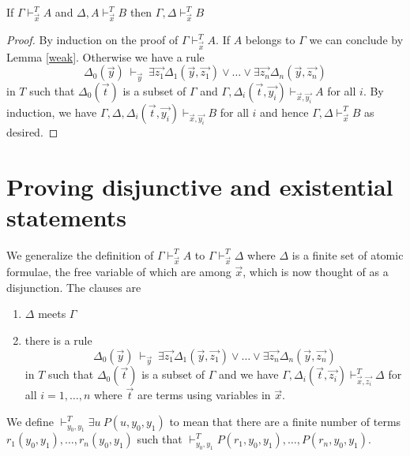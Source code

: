 \documentclass[10pt,a4paper]{article}
\begin{document}
\begin{lemma}\label{cut}
If $\Gamma\vdash_{\vec{x}}^T A$ and $\Delta,A\vdash_{\vec{x}}^T B$ then
$\Gamma,\Delta\vdash_{\vec{x}}^T B$
\end{lemma}

\begin{proof}
By induction on the proof of $\Gamma\vdash_{\vec{x}}^T A$. If $A$ belongs to $\Gamma$ we can
conclude by Lemma \ref{weak}. 
Otherwise we have a rule
$$
\Delta_0(\vec{y})~\vdash_{\vec{y}}~
\exists \vec{z_1}\Delta_1(\vec{y},\vec{z_1})\vee\dots\vee\exists \vec{z_n}\Delta_n(\vec{y},\vec{z_n})
$$
in $T$ such that $\Delta_0(\vec{t})$ is a subset of $\Gamma$ and
$\Gamma,\Delta_i(\vec{t},\vec{y_i})\vdash_{\vec{x},\vec{y_i}} A$ for all $i$.
By induction, we have $\Gamma,\Delta,\Delta_i(\vec{t},\vec{y_i})\vdash_{\vec{x},\vec{y_i}} B$ for all $i$
and hence $\Gamma,\Delta\vdash_{\vec{x}}^T B$ as desired.
\end{proof}

\section{Proving disjunctive and existential statements}

 We generalize the definition of $\Gamma\vdash_{\vec{x}}^T A$ to 
$\Gamma\vdash_{\vec{x}}^T \Delta$ where $\Delta$ is a finite set of atomic formulae, the free
variable of which are among $\vec{x}$, which is now thought of as a disjunction. The clauses are

\begin{enumerate}
\item $\Delta$ meets $\Gamma$

\item there is a rule
$$
\Delta_0(\vec{y})~\vdash_{\vec{y}}~
\exists \vec{z_1}\Delta_1(\vec{y},\vec{z_1})\vee\dots\vee\exists \vec{z_n}\Delta_n(\vec{y},\vec{z_n})
$$
in $T$ such that $\Delta_0(\vec{t})$ is a subset of $\Gamma$ and
we have $\Gamma,\Delta_i(\vec{t},\vec{z_i})\vdash^T_{\vec{x},\vec{z_i}} \Delta$ for all $i = 1,\dots,n$
where $\vec{t}$ are terms using variables in $\vec{x}$.
\end{enumerate}

 We define $\vdash_{y_0,y_1}^T \exists u~P(u,y_0,y_1)$ to mean that there are a finite number
of terms $r_1(y_0,y_1),\dots,r_n(y_0,y_1)$ such that
$\vdash_{y_0,y_1}^T P(r_1,y_0,y_1),\dots,P(r_n,y_0,y_1)$.

\end{document}
